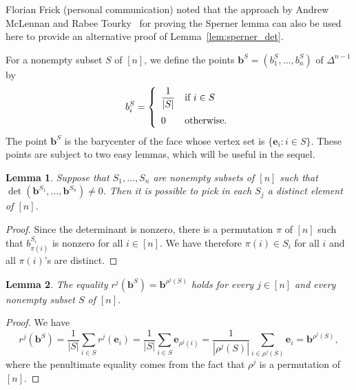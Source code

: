 \documentclass[12pt]{amsart}
\newtheorem{lemma}{Lemma}
\theoremstyle{definition}
\theoremstyle{remark}
\def\R{\mathbb{R}}
\def\aa{\boldsymbol{a}}
\def\bb{\boldsymbol{b}}
\def\ee{\boldsymbol{e}}
\def\ds{\displaystyle}
\def\det{\operatorname{det}}
\begin{document}
Florian Frick (personal communication) noted that the approach by Andrew McLennan and Rabee Tourky~\cite{mclennan2008using} for proving the Sperner lemma can also be used here to provide an alternative proof of Lemma~\ref{lem:sperner_det}.

%

For a nonempty subset $S$ of $[n]$, we define the points $\bb^S=(b_1^S,\ldots,b_n^S)$ of $\Delta^{n-1}$ by $$b_i^S=\left\{\begin{array}{ll}\ds{ \frac 1 {|S|}}& \mbox{if $i\in S$}\medskip \\ 0 & \mbox{otherwise.}\end{array}\right.$$
The point $\bb^S$ is the barycenter of the face whose vertex set is $\{ \ee_i\colon i\in S\}$. These points are subject to two easy lemmas, which will be useful in the sequel.

\begin{lemma}\label{lem:cover}
Suppose that $S_1,\ldots,S_n$ are nonempty subsets of $[n]$ such that $\det(\bb^{S_1},\ldots,\bb^{S_n})\neq 0$. Then it is possible to pick in each $S_j$ a distinct element of $[n]$.
\end{lemma}

\begin{proof}
Since the determinant is nonzero, there is a permutation $\pi$ of $[n]$ such that $b_{\pi(i)}^{S_i}$ is nonzero for all $i\in[n]$. We have therefore $\pi(i)\in S_i$ for all $i$ and all $\pi(i)$'s are distinct.
\end{proof}

\begin{lemma}\label{lem:sym_b}
The equality $r^j(\bb^S)=\bb^{\rho^j(S)}$ holds for every $j\in[n]$ and every nonempty subset $S$ of $[n]$.
\end{lemma}

\begin{proof}
We have 
$$r^j(\bb^S)=\frac 1 {|S|} \sum_{i\in S}r^j(\ee_i)=\frac 1 {|S|} \sum_{i\in S}\ee_{\rho^j(i)}=\frac 1 {|\rho^j(S)|} \sum_{i\in \rho^j(S)}\ee_i=\bb^{\rho^j(S)},$$ where the penultimate equality comes from the fact that $\rho^j$ is a permutation of $[n]$.
\end{proof}
\end{document}
